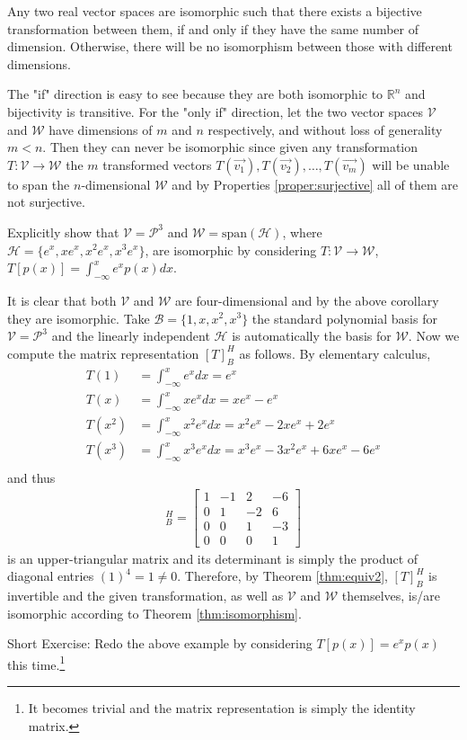 \begin{proper}
Any two real vector spaces are isomorphic such that there exists a bijective transformation between them, if and only if they have the same number of dimension. Otherwise, there will be no isomorphism between those with different dimensions.
\end{proper}
The "if" direction is easy to see because they are both isomorphic to $\mathbb{R}^n$ and bijectivity is transitive. For the "only if" direction, let the two vector spaces $\mathcal{V}$ and $\mathcal{W}$ have dimensions of $m$ and $n$ respectively, and without loss of generality $m < n$. Then they can never be isomorphic since given any transformation $T: \mathcal{V} \to \mathcal{W}$ the $m$ transformed vectors $T(\vec{v_1}), T(\vec{v_2}), \ldots, T(\vec{v_m})$ will be unable to span the $n$-dimensional $\mathcal{W}$ and by Properties \ref{proper:surjective} all of them are not surjective.
\begin{exmp}
Explicitly show that $\mathcal{V} = \mathcal{P}^3$ and $\mathcal{W} = \text{span}(\mathcal{H})$, where $\mathcal{H} = \{e^x, xe^x, x^2e^x, x^3e^x\}$, are isomorphic by considering $T: \mathcal{V} \to \mathcal{W}$, $T[p(x)] = \int_{-\infty}^x e^x p(x) dx$.
\end{exmp}
\begin{solution}
It is clear that both $\mathcal{V}$ and $\mathcal{W}$ are four-dimensional and by the above corollary they are isomorphic. Take $\mathcal{B} = \{1, x, x^2, x^3\}$ the standard polynomial basis for $\mathcal{V} = \mathcal{P}^3$ and the linearly independent $\mathcal{H}$ is automatically the basis for $\mathcal{W}$. Now we compute the matrix representation $[T]_B^H$ as follows. By elementary calculus,
\begin{align*}
T(1) &= \int_{-\infty}^x e^x dx = e^x \\
T(x) &= \int_{-\infty}^x xe^x dx = xe^x - e^x \\
T(x^2) &= \int_{-\infty}^x x^2e^x dx = x^2e^x - 2xe^x + 2e^x \\
T(x^3) &= \int_{-\infty}^x x^3e^x dx = x^3e^x - 3x^2e^x + 6xe^x - 6e^x \\
\end{align*}
and thus
\begin{align*}
[T]_B^H = 
\begin{bmatrix}
1 & -1 & 2 & -6 \\ 
0 & 1 & -2 & 6 \\
0 & 0 & 1 & -3 \\
0 & 0 & 0 & 1
\end{bmatrix}
\end{align*}
is an upper-triangular matrix and its determinant is simply the product of diagonal entries $(1)^4 = 1 \neq 0$. Therefore, by Theorem \ref{thm:equiv2}, $[T]_B^H$ is invertible and the given transformation, as well as $\mathcal{V}$ and $\mathcal{W}$ themselves, is/are isomorphic according to Theorem \ref{thm:isomorphism}.
\end{solution}
Short Exercise: Redo the above example by considering $T[p(x)] = e^x p(x)$ this time.\footnote{It becomes trivial and the matrix representation is simply the identity matrix.}

